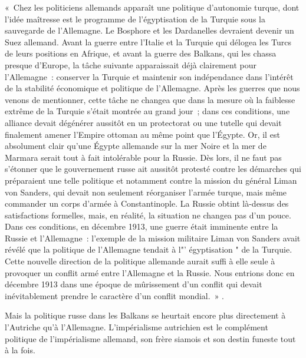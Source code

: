 \documentclass[french,twoside]{book} %
\begin{document}
{ « Chez les politiciens allemands apparaît une politique d’autonomie turque, dont l’idée maîtresse est le programme de l’égyptisation de la Turquie sous la sauvegarde de l’Allemagne. Le Bosphore et les Dardanelles devraient devenir un Suez allemand. Avant la guerre entre l’Italie et la Turquie qui délogea les Turcs de leurs positions en Afrique, et avant la guerre des Balkans, qui les chassa presque d’Europe, la tâche suivante apparaissait déjà clairement pour l’Allemagne : conserver la Turquie et maintenir son indépendance dans l’intérêt de la stabilité économique et politique de l’Allemagne. Après les guerres que nous venons de mentionner, cette tâche ne changea que dans la mesure où la faiblesse extrême de la Turquie s’était montrée au grand jour ; dans ces conditions, une alliance devait dégénérer aussitôt en un protectorat ou une tutelle qui devait finalement amener l’Empire ottoman au même point que l’Égypte. Or, il est absolument clair qu’une Égypte allemande sur la mer Noire et la mer de Marmara serait tout à fait intolérable pour la Russie. Dès lors, il ne faut pas s’étonner que le gouvernement russe ait aussitôt protesté contre les démarches qui préparaient une telle politique et notamment contre la mission du général Liman von Sanders, qui devait non seulement réorganiser l’armée turque, mais même commander un corps d’armée à Constantinople. La Russie obtint là-dessus des satisfactions formelles, mais, en réalité, la situation ne changea pas d’un pouce. Dans ces conditions, en décembre 1913, une guerre était imminente entre la Russie et l’Allemagne : l’exemple de la mission militaire Liman von Sanders avait révélé que la politique de l’Allemagne tendait à l"' égyptisation " de la Turquie. Cette nouvelle direction de la politique allemande aurait suffi à elle seule à provoquer un conflit armé entre l’Allemagne et la Russie. Nous entrions donc en décembre 1913 dans une époque de mûrissement d’un conflit qui devait inévitablement prendre le caractère d’un conflit mondial. »
}.\par
Mais la politique russe dans les Balkans se heurtait encore plus directement à l’Autriche qu’à l’Allemagne. L'impérialisme autrichien est le complément politique de l’impérialisme allemand, son frère siamois et son destin funeste tout à la fois.\par
\end{document}
